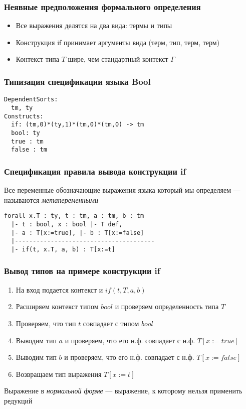 
\begin{frame}
\frametitle{Неявные предположения формального определения}

\IFF

\begin{itemize}
\item Все выражения делятся на два вида: термы и типы
\item Конструкция if принимает аргументы вида (терм, тип, терм, терм)
\item Контекст типа $T$ шире, чем стандартный контекст $\Gamma$
\end{itemize}

\end{frame}

\begin{frame}[fragile]
\frametitle{Типизация спецификации языка Bool}
\begin{verbatim}
DependentSorts:
  tm, ty
Constructs:
  if: (tm,0)*(ty,1)*(tm,0)*(tm,0) -> tm
  bool: ty
  true : tm
  false : tm
\end{verbatim}
\end{frame}


\begin{frame}[fragile]
\frametitle{Спецификация правила вывода конструкции if}

\IFF

Все переменные обозначающие выражения языка который мы определяем --- называются \textit{метапеременными}

\begin{verbatim}
forall x.T : ty, t : tm, a : tm, b : tm
  |- t : bool, x : bool |- T def,
  |- a : T[x:=true], |- b : T[x:=false]
  |---------------------------------------
  |- if(t, x.T, a, b) : T[x:=t]
\end{verbatim}

\end{frame}
\begin{frame}
\frametitle{Вывод типов на примере конструкции if}

\IFF

\begin{enumerate}
\item На вход подается контекст и $if(t, T, a, b)$
\item Расширяем контекст типом $bool$ и проверяем определенность типа $T$
\item Проверяем, что тип $t$ совпадает с типом $bool$
\item Выводим тип $a$ и проверяем, что его н.ф. совпадает с н.ф. $T[x:=true]$
\item Выводим тип $b$ и проверяем, что его н.ф. совпадает с н.ф. $T[x:=false]$
\item Возвращаем тип выражения $T[x:=t]$
\end{enumerate}
Выражение в \textit{нормальной форме} --- выражение, к которому нельзя применить редукций
\end{frame}

